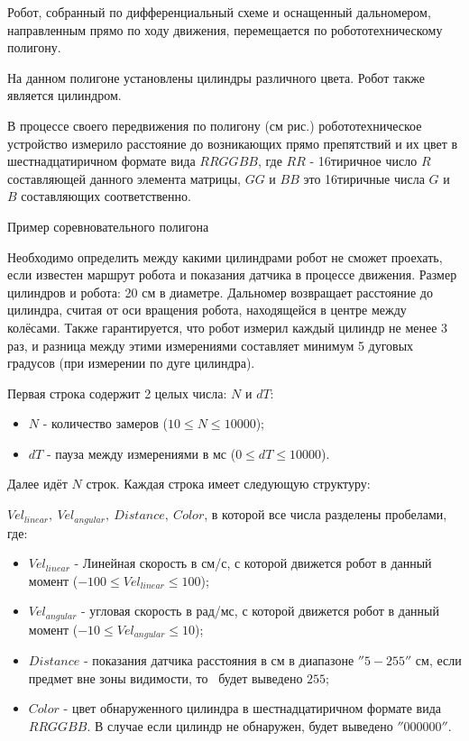 
Робот, собранный по дифференциальный схеме и оснащенный дальномером, направленным прямо по ходу движения, перемещается по робототехническому полигону.

На данном полигоне установлены цилиндры различного цвета. Робот также является цилиндром.

В процессе своего передвижения по полигону (см рис.) робототехническое устройство измерило расстояние до 
возникающих прямо препятствий и их цвет в шестнадцатиричном формате вида $RRGGBB$, где $RR$ - 16тиричное число $R$ 
составляющей данного элемента матрицы, $GG$ и $BB$ это 16тиричные числа $G$ и $B$ составляющих соответственно.


Пример соревновательного полигона

Необходимо определить между какими цилиндрами робот не сможет проехать, если известен маршрут робота и показания
датчика в процессе движения. Размер цилиндров и робота: 20 см в диаметре. Дальномер возвращает расстояние до цилиндра, считая от оси вращения робота, находящейся в центре между колёсами. Также гарантируется, что робот  измерил каждый цилиндр не менее 3 раз, и разница между этими измерениями составляет минимум 5 дуговых градусов (при измерении по дуге цилиндра).

 
Первая строка содержит 2 целых числа: $N$ и $dT$:

\begin{itemize}
    \item $N$ - количество замеров ($10 \leq N \leq 10000$);
    \item $dT$ - пауза между измерениями в мс ($0 \leq dT \leq 10000$).
\end{itemize}

Далее идёт $N$ строк. Каждая строка имеет следующую структуру:

$Vel_{linear},~ Vel_{angular},~ Distance,~ Color$, в которой все числа разделены пробелами, где:

\begin{itemize}
    \item $Vel_{linear}$ - Линейная скорость в см/с, с которой движется робот в данный момент ($-100 \leq Vel_{linear} \leq 100$);
    \item $Vel_{angular}$ - угловая скорость в рад/мс, с которой движется робот в данный момент ($-10 \leq Vel_{angular} \leq 10$);
    \item $Distance$ - показания датчика расстояния в см в диапазоне $''5-255''$ см, если предмет вне зоны видимости, то  будет выведено $255$;
    \item $Color$ - цвет обнаруженного цилиндра в шестнадцатиричном формате вида $RRGGBB$. В случае если цилиндр не обнаружен, будет выведено $ ''000000'' $.
\end{itemize}

